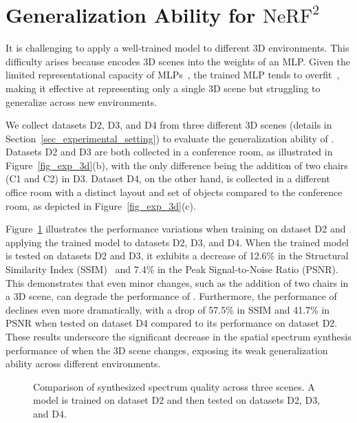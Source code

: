 
\section{Generalization Ability for \texorpdfstring{$\text{NeRF}^2$}{NeRF2}}\label{sec_3d_scene}
It is challenging to apply a well-trained \nerft model to different 3D environments.
This difficulty arises because \nerft encodes 3D scenes into the weights of an MLP.
Given the limited representational capacity of MLPs~\cite{mihajlovic2023resfields}, the trained MLP tends to overfit~\cite{wang2021ibrnet, liu2022neural}, making it effective at representing only a single 3D scene but struggling to generalize across new environments.



We collect datasets D2, D3, and D4 from three different 3D scenes (details in Section~\ref{sec_experimental_setting}) to evaluate the generalization ability of \nerft.
Datasets D2 and D3 are both collected in a conference room, as illustrated in Figure~\ref{fig_exp_3d}(b), with the only difference being the addition of two chairs (C1 and C2) in D3.
Dataset D4, on the other hand, is collected in a different office room with a distinct layout and set of objects compared to the conference room, as depicted in Figure~\ref{fig_exp_3d}(c).



Figure~\ref{fig_motivation} illustrates the performance variations when training \nerft on dataset D2 and applying the trained model to datasets D2, D3, and D4.
When the trained \nerft model is tested on datasets D2 and D3, it exhibits a decrease of 12.6\% in the Structural Similarity Index (SSIM)~\cite{wang2004image} and 7.4\% in the Peak Signal-to-Noise Ratio (PSNR). 
This demonstrates that even minor changes, such as the addition of two chairs in a 3D scene, can degrade the performance of \nerft.
Furthermore, the performance of \nerft declines even more dramatically, with a drop of 57.5\% in SSIM and 41.7\% in PSNR when tested on dataset D4 compared to its performance on dataset D2.
These results underscore the significant decrease in the spatial spectrum synthesis performance of \nerft when the 3D scene changes, exposing its weak generalization ability across different environments.


\begin{figure}[t]
\centering
	\vspace{-0.15in}
 \caption{Comparison of synthesized spectrum quality across three scenes. A \nerft model is trained on dataset D2 and then tested on datasets D2, D3, and D4.}
\label{fig_motivation}
 \vspace{-0.15in}
\end{figure}







